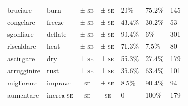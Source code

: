 \documentclass[output=paper,colorlinks,citecolor=brown
]{langscibook}
\begin{document}
\begin{table}
{\begin{tabular}{|p{}|p{}||p{}|p{}||p{}|p{}||p{}|}
bruciare     & burn      & ± \textsc{se}                                                                                     & ± \textsc{se}                                                                          & 20\%                              & 75.2\%                                    & 145                 \\
congelare    & freeze    & ± \textsc{se}                                                                                     & ± \textsc{se}                                                                          & 43.4\%                            & 30.2\%                                    & 53                  \\
sgonfiare    & deflate   & ± \textsc{se}                                                                                     & ± \textsc{se}                                                                          & 90.4\%                            & 6\%                                       & 301                 \\
riscaldare   & heat      & ± \textsc{se}                                                                                     & ± \textsc{se}                                                                          & 71.3\%                            & 7.5\%                                     & 80                  \\
asciugare    & dry       & ± \textsc{se}                                                                                     & ± \textsc{se}                                                                          & 55.3\%                            & 27.4\%                                    & 179                 \\
arrugginire  & rust      & ± \textsc{se}                                                                                     & ± \textsc{se}                                                                          & 36.6\%                            & 63.4\%                                    & 101                 \\
migliorare   & improve   & - \textsc{se}                                                                                     & \cellcolor[HTML]{BFBFBF}± \textsc{se}                                                  & 8.5\%                             & 90.4\%                                    & 94                  \\
aumentare    & increa \textsc{se}   & - \textsc{se}                                                                                     & - \textsc{se}                                                                          & 0                                 & 100\%                                     & 179                 \\

\end{tabular}}
\end{table}
\end{document}
